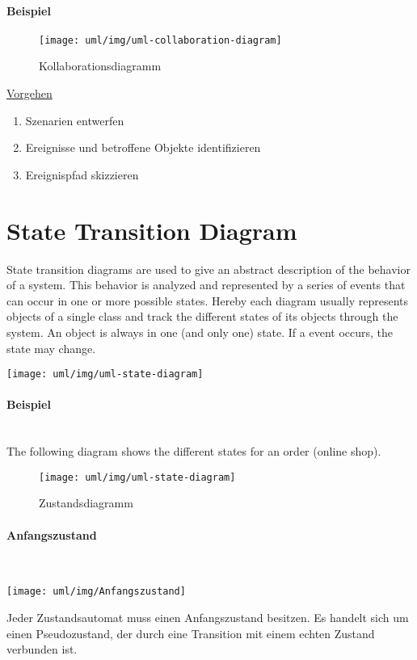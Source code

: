 \begin{minipage}[c]{0.45\linewidth}
\paragraph{Beispiel}
%
\begin{figure}[H]
\begin{center}
\texttt{[image: uml/img/uml-collaboration-diagram]}
\caption{Kollaborationsdiagramm}
\label{fig:KOL1}
\end{center}
\end{figure}
%
\fi
\ifslides
\newpage
\fi
\underline{Vorgehen}
\begin{enumerate}
\item Szenarien entwerfen
\item Ereignisse und betroffene Objekte identifizieren
\item Ereignispfad skizzieren
\end{enumerate}
\ifslides
\newpage
\fi
\section{State Transition Diagram}
State transition diagrams are used to give an abstract description of the behavior of a
system. This behavior is analyzed and represented by a series of events that
can occur in one or more possible states. Hereby each diagram usually
represents objects of a single class and track the different states of its
objects through the system. An object is always in one (and only one) state.
If a event occurs, the state may change.

%
\ifslides
\begin{center}
\texttt{[image: uml/img/uml-state-diagram]}
\end{center}
\else
\newpage
\paragraph{Beispiel}\ \\[2ex]
The following diagram shows the different states for an order (online shop).
\begin{figure}[H]
\begin{center}
\texttt{[image: uml/img/uml-state-diagram]}
\caption{Zustandsdiagramm}
\end{center}
\end{figure}
\fi
%
\paragraph{Anfangszustand}\ \\[2ex]
\begin{minipage}[c]{0.1\linewidth}
\texttt{[image: uml/img/Anfangszustand]}
\end{minipage}
\begin{minipage}[c]{0.89\linewidth}
Jeder Zustandsautomat muss einen Anfangszustand besitzen.
Es handelt sich um einen Pseudozustand, der durch eine
Transition mit einem echten Zustand verbunden ist.
\end{minipage}
%

\end{minipage}
